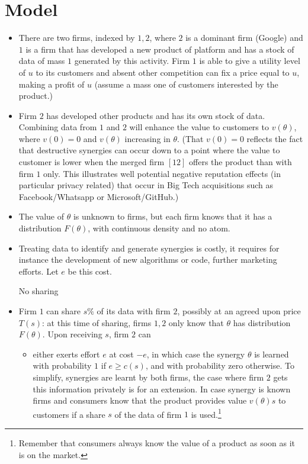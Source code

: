 \documentclass[a4paper,leqno]{article}%
\renewcommand{\t}{\theta}
\begin{document}
\section{Model}
\begin{itemize}
    \item There are two firms, indexed by $1,2$, where $2$ is a dominant firm (Google) and $1$ is a firm that has developed a new product of platform and has a stock of data of mass $1$ generated by this activity. Firm $1$ is able to give a utility level of $u$ to its customers and absent other competition can fix a price equal to $u$, making a profit of $u$ (assume a mass one of customers interested by the product.)
    \item Firm $2$ has developed other products and has its own stock of data. Combining data from $1$ and $2$ will enhance the value to customers to $v(\t)$, where $v(0)=0$ and $v(\t)$ increasing in $\t$. (That $v(0)=0$ reflects the fact that destructive synergies can occur down to a point where the value to customer is lower when the merged firm $[12]$ offers the product than with firm $1$ only. This illustrates well potential negative reputation effects (in particular privacy related) that occur in Big Tech acquisitions such as Facebook/Whatsapp or Microsoft/GitHub.)
    \item The value of $\t$ is unknown to firms, but each firm knows that it has a distribution $F(\t)$, with continuous density and no atom.
    \item Treating data to identify and generate synergies is costly, it requires for instance the development of new algorithms or code, further marketing efforts. Let $e$ be this cost. 
    \item [No sharing]
    \item Firm $1$ can share $s\%$ of its data with firm $2$, possibly at an agreed upon price $T(s)$: at this time of sharing, firms $1,2$ only know that $\t$ has distribution $F(\t)$. Upon receiving $s$, firm $2$ can 
    \begin{itemize}
        \item either exerts effort $e$ at cost $-e$, in which case the synergy $\t$ is learned with probability $1$ if $e\geq c(s)$, and with probability zero otherwise. To simplify, synergies are learnt by both firms, the case where firm $2$ gets this information privately is for an extension. In case synergy is known firms and consumers know that the product provides value $v(\t)s$ to customers if a share $s$ of the data of firm $1$ is used.\footnote{Remember that consumers always know the value of a product as soon as it is on the market.} 

\end{itemize}
\end{itemize}
\end{document}
